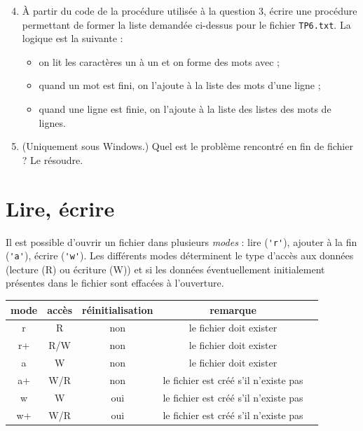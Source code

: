 \begin{enumerate}
\setcounter{enumi}{3}
\item À partir du code de la procédure utilisée à la question 3, écrire une procédure permettant de former la liste demandée ci-dessus pour le fichier \verb|TP6.txt|. La logique est la suivante :
\begin{itemize}
 \item on lit les caractères un à un et on forme des mots avec ;
 \item quand un mot est fini, on l'ajoute à la liste des mots d'une ligne ;
 \item quand une ligne est finie, on l'ajoute à la liste des listes des mots de lignes.
\end{itemize}

\item (Uniquement sous Windows.) Quel est le problème rencontré en fin de fichier ? Le résoudre.
\end{enumerate}

\newpage
\section*{Lire, écrire}

Il est possible d'ouvrir un fichier dans plusieurs \textit{modes} : lire (\verb|'r'|), ajouter à la fin (\verb|'a'|), écrire (\verb|'w'|). Les différents modes déterminent le type d'accès aux données (lecture (R) ou écriture (W)) et si les données éventuellement initialement présentes dans le fichier sont effacées à l'ouverture.

\begin{center}
\begin{tabular}{|c|c|c|c|c|}\hline
mode & accès  & réinitialisation & remarque \\\hline
r    & R      & non              & le fichier doit exister \\\hline
r+   & R/W    & non              & le fichier doit exister \\\hline
a    & W      & non              & le fichier doit exister \\\hline
a+   & W/R    & non              & le fichier est créé s'il n'existe pas \\\hline
w    & W      & oui              & le fichier est créé s'il n'existe pas \\\hline
w+   & W/R    & oui              & le fichier est créé s'il n'existe pas \\\hline
\end{tabular}
\end{center}

